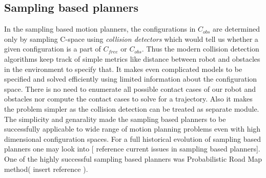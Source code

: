\documentclass[MTech]{iitmdiss}
\begin{document}
\subsection{Sampling based planners}
In the sampling based motion planners, the configurations in \emph{$C_{obs}$} are determined only by sampling C-space using \emph{collision detectors} which would tell us whether a given configuration is a part of $C_{free}$ or $C_{obs}$. Thus the modern collision detection algorithms keep track of simple metrics like distance between robot and obstacles in the environment to specify that. It makes even complicated models to be specified and solved efficiently using limited information about the configuration space. There is no need to enumerate all possible contact cases of our robot and obstacles nor compute the contact cases to solve for a trajectory. Also it makes the problem simpler as the collision detection can be treated as separate module. The simplicity and genarality made the sampling based planners to be successfully applicable to wide range of motion planning problems even with high dimensional configuration spaces. For a full historical evolution of sampling based planners one may look into [ reference current issues in sampling based planners]. One of the highly successful sampling based planners was Probabilistic Road Map method( insert reference ). 
\end{document}
